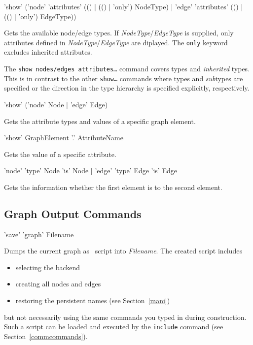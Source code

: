 \begin{rail}
  'show' ('node' 'attributes' (() | (() | 'only') NodeType) | 'edge' 'attributes' (() | (() | 'only') EdgeType))
\end{rail}
Gets the available node/edge  types. If \emph{NodeType}/\emph{EdgeType} is supplied, only attributes defined in \emph{NodeType}/\emph{EdgeType} are diplayed. The \texttt{only} keyword excludes inherited attributes.\\
\begin{note}
The \texttt{show nodes/edges attributes\dots} command covers types and \emph{inherited} types. This is in contrast to the other \texttt{show\dots} commands where types and \emph{sub}types are specified or the direction in the type hierarchy is specified explicitly, respectively.
\end{note}

\begin{rail}
 'show' ('node' Node | 'edge' Edge)
\end{rail}
Gets the attribute types and values of a specific graph element.

\begin{rail}
  'show' GraphElement '.' AttributeName
\end{rail}
Gets the value of a specific attribute.

\begin{rail}
  'node' 'type' Node 'is' Node | 'edge' 'type' Edge 'is' Edge
\end{rail}
Gets the information whether the first element is  to the second element.

\subsection{Graph Output Commands}
\label{outputcmds}

\begin{rail}
  'save' 'graph' Filename
\end{rail}
Dumps the current graph as \GrShell\ script into \emph{Filename}. The created script includes
\begin{itemize}
  \item selecting the backend
  \item creating all nodes and edges
  \item restoring the persistent names (see Section~\ref{mani})
\end{itemize}
but not necessarily using the same commands you typed in during construction. 
Such a script can be loaded and executed by the \texttt{include} command (see Section~\ref{commcommands}).

